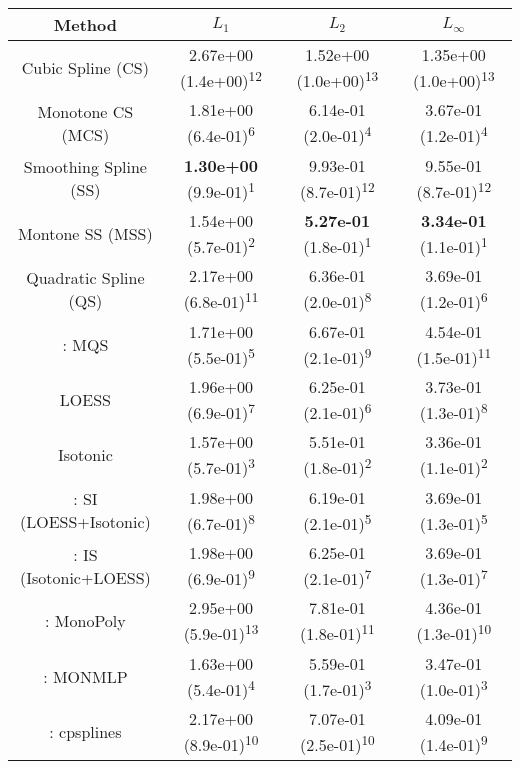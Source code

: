 \begin{tabular}{cccc}
\toprule
Method&$L_1$&$L_2$&$L_\infty$\tabularnewline
\midrule
Cubic Spline (CS)& 2.67e+00 (1.4e+00)\textsuperscript{12}& 1.52e+00 (1.0e+00)\textsuperscript{13}& 1.35e+00 (1.0e+00)\textsuperscript{13}\tabularnewline
Monotone CS (MCS)& 1.81e+00 (6.4e-01)\textsuperscript{6}& 6.14e-01 (2.0e-01)\textsuperscript{4}& 3.67e-01 (1.2e-01)\textsuperscript{4}\tabularnewline
Smoothing Spline (SS)& \textbf{1.30e+00} (9.9e-01)\textsuperscript{1}& 9.93e-01 (8.7e-01)\textsuperscript{12}& 9.55e-01 (8.7e-01)\textsuperscript{12}\tabularnewline
Montone SS (MSS)& 1.54e+00 (5.7e-01)\textsuperscript{2}& \textbf{5.27e-01} (1.8e-01)\textsuperscript{1}& \textbf{3.34e-01} (1.1e-01)\textsuperscript{1}\tabularnewline
Quadratic Spline (QS)& 2.17e+00 (6.8e-01)\textsuperscript{11}& 6.36e-01 (2.0e-01)\textsuperscript{8}& 3.69e-01 (1.2e-01)\textsuperscript{6}\tabularnewline
\textcite{heMonotoneBsplineSmoothing1998}: MQS& 1.71e+00 (5.5e-01)\textsuperscript{5}& 6.67e-01 (2.1e-01)\textsuperscript{9}& 4.54e-01 (1.5e-01)\textsuperscript{11}\tabularnewline
LOESS& 1.96e+00 (6.9e-01)\textsuperscript{7}& 6.25e-01 (2.1e-01)\textsuperscript{6}& 3.73e-01 (1.3e-01)\textsuperscript{8}\tabularnewline
Isotonic& 1.57e+00 (5.7e-01)\textsuperscript{3}& 5.51e-01 (1.8e-01)\textsuperscript{2}& 3.36e-01 (1.1e-01)\textsuperscript{2}\tabularnewline
\textcite{mammenEstimatingSmoothMonotone1991}: SI (LOESS+Isotonic)& 1.98e+00 (6.7e-01)\textsuperscript{8}& 6.19e-01 (2.1e-01)\textsuperscript{5}& 3.69e-01 (1.3e-01)\textsuperscript{5}\tabularnewline
\textcite{mammenEstimatingSmoothMonotone1991}: IS (Isotonic+LOESS)& 1.98e+00 (6.9e-01)\textsuperscript{9}& 6.25e-01 (2.1e-01)\textsuperscript{7}& 3.69e-01 (1.3e-01)\textsuperscript{7}\tabularnewline
\textcite{murrayFastFlexibleMethods2016a}: MonoPoly& 2.95e+00 (5.9e-01)\textsuperscript{13}& 7.81e-01 (1.8e-01)\textsuperscript{11}& 4.36e-01 (1.3e-01)\textsuperscript{10}\tabularnewline
\textcite{cannonMonmlpMultilayerPerceptron2017}: MONMLP& 1.63e+00 (5.4e-01)\textsuperscript{4}& 5.59e-01 (1.7e-01)\textsuperscript{3}& 3.47e-01 (1.0e-01)\textsuperscript{3}\tabularnewline
\textcite{navarro-garciaConstrainedSmoothingOutofrange2023}: cpsplines& 2.17e+00 (8.9e-01)\textsuperscript{10}& 7.07e-01 (2.5e-01)\textsuperscript{10}& 4.09e-01 (1.4e-01)\textsuperscript{9}\tabularnewline
\bottomrule
\end{tabular}
